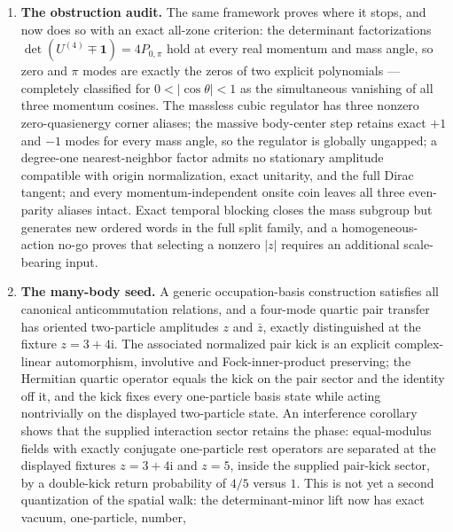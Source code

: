 \documentclass[11pt]{article}
\newcommand{\ii}{\mathrm{i}}
\newcommand{\id}{\mathbf{1}}
\begin{document}
\begin{enumerate}[leftmargin=2em]
  finite-to-analytic momentum-sign bridge is exact, an iterated three-torus
  Plancherel theorem gives the exact $N^{-3}$ wave-packet normalization, and a
  compact-support multiplier theorem yields momentum-space $L^2$ convergence
  at every fixed time.  Arbitrary position-dependent Pluecker fields evolve
  unitarily, and site-dependent chiral rotation induces exact endpoint links.
  \item \textbf{The obstruction audit.}  The same framework proves where it
  stops, and now does so with an exact all-zone criterion: the determinant
  factorizations $\det(U^{(4)}\mp\id)=4P_{0,\pi}$ hold at every real momentum
  and mass angle, so zero and $\pi$ modes are exactly the zeros of two
  explicit polynomials --- completely classified for $0<|\cos\theta|<1$ as
  the simultaneous vanishing of all three momentum cosines.  The massless
  cubic regulator has three nonzero
  zero-quasienergy
  corner aliases; the massive body-center step retains exact $+1$ and $-1$
  modes for every mass angle, so the regulator is globally ungapped; a
  degree-one nearest-neighbor factor admits no stationary amplitude compatible
  with origin normalization, exact unitarity, and the full Dirac tangent; and
  every momentum-independent onsite coin leaves all three even-parity aliases
  intact.  Exact temporal blocking closes the mass subgroup but generates new
  ordered words in the full split family, and a homogeneous-action no-go
  proves that selecting a nonzero $|z|$ requires an additional scale-bearing
  input.
  \item \textbf{The many-body seed.}  A generic occupation-basis construction
  satisfies all canonical anticommutation relations, and a four-mode quartic
  pair transfer has oriented two-particle amplitudes $z$ and $\bar z$, exactly
  distinguished at the fixture $z=3+4\ii$.  The associated normalized pair
  kick is an explicit complex-linear automorphism, involutive and
  Fock-inner-product preserving; the Hermitian quartic operator equals the
  kick on the pair sector and the identity off it, and the kick fixes every
  one-particle basis state while acting nontrivially on the displayed
  two-particle state.  An interference corollary shows that the supplied
  interaction sector retains the phase:
  equal-modulus fields with exactly conjugate one-particle rest operators
  are separated at the displayed fixtures $z=3+4\ii$ and $z=5$, inside the
  supplied pair-kick sector, by a double-kick
  return probability of $4/5$ versus $1$.  This is not yet a second quantization of the spatial
  walk: the determinant-minor lift now has exact vacuum, one-particle, number,

\end{enumerate}
\end{document}
